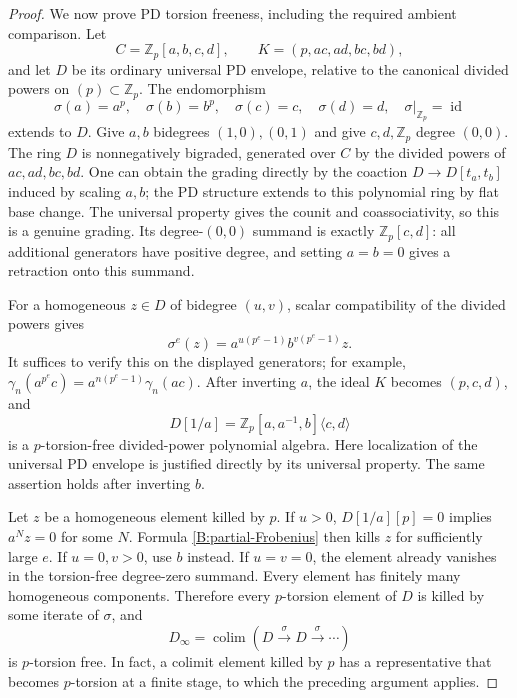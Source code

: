 \begin{proof}
We now prove PD torsion freeness, including the required ambient
comparison. Let
\[
 C=\mathbb Z_p[a,b,c,d],\qquad
 K=(p,ac,ad,bc,bd),
\]
and let $D$ be its ordinary universal PD envelope, relative to the
canonical divided powers on $(p)\subset\mathbb Z_p$.
The endomorphism
\[
 \sigma(a)=a^p,\quad \sigma(b)=b^p,\quad
 \sigma(c)=c,\quad \sigma(d)=d,\quad
 \sigma|_{\mathbb Z_p}=\operatorname{id}
\]
extends to $D$. Give $a,b$ bidegrees $(1,0),(0,1)$ and give
$c,d,\mathbb Z_p$ degree $(0,0)$. The ring $D$ is nonnegatively
bigraded, generated over $C$ by the divided powers of
$ac,ad,bc,bd$. One can obtain the grading directly by the
coaction $D\to D[t_a,t_b]$ induced by scaling $a,b$; the PD
structure extends to this polynomial ring by flat base change.
The universal property gives the counit and coassociativity, so
this is a genuine grading. Its degree-$(0,0)$ summand is exactly
$\mathbb Z_p[c,d]$: all additional generators have positive
degree, and setting $a=b=0$ gives a retraction onto this summand.

For a homogeneous $z\in D$ of bidegree $(u,v)$, scalar
compatibility of the divided powers gives
\begin{equation}\label{B:partial-Frobenius}
 \sigma^e(z)=a^{u(p^e-1)}b^{v(p^e-1)}z.
\end{equation}
It suffices to verify this on the displayed generators; for
example,
$\gamma_n(a^{p^e}c)=a^{n(p^e-1)}\gamma_n(ac)$.
After inverting $a$, the ideal $K$ becomes $(p,c,d)$, and
\[
 D[1/a]=\mathbb Z_p[a,a^{-1},b]\langle c,d\rangle
\]
is a $p$-torsion-free divided-power polynomial algebra. Here
localization of the universal PD envelope is justified directly
by its universal property. The same assertion holds after
inverting $b$.

Let $z$ be a homogeneous element killed by $p$. If $u>0$,
$D[1/a][p]=0$ implies $a^Nz=0$ for some $N$. Formula
\eqref{B:partial-Frobenius} then kills $z$ for sufficiently large
$e$. If $u=0,v>0$, use $b$ instead. If $u=v=0$, the element
already vanishes in the torsion-free degree-zero summand.
Every element has finitely many homogeneous components.
Therefore every $p$-torsion element of $D$ is killed by some
iterate of $\sigma$, and
\[
 D_\infty=\mathop{\operatorname{colim}}
 (D\xrightarrow{\sigma}D\xrightarrow{\sigma}\cdots)
\]
is $p$-torsion free. In fact, a colimit element killed by $p$
has a representative that becomes $p$-torsion at a finite stage,
to which the preceding argument applies.


\end{proof}

